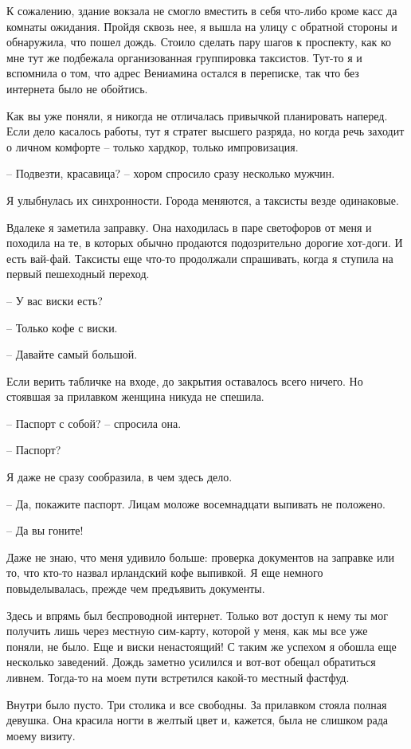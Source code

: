\documentclass[
]{book}
\begin{document}
К сожалению, здание вокзала не смогло вместить в себя что-либо кроме касс да комнаты ожидания. Пройдя сквозь нее, я вышла на улицу с обратной стороны и обнаружила, что пошел дождь. Стоило сделать пару шагов к проспекту, как ко мне тут же подбежала организованная группировка таксистов. Тут-то я и вспомнила о том, что адрес Вениамина остался в переписке, так что без интернета было не обойтись.

Как вы уже поняли, я никогда не отличалась привычкой планировать наперед. Если дело касалось работы, тут я стратег высшего разряда, но когда речь заходит о личном комфорте -- только хардкор, только импровизация.

-- Подвезти, красавица? -- хором спросило сразу несколько мужчин.

Я улыбнулась их синхронности. Города меняются, а таксисты везде одинаковые.

Вдалеке я заметила заправку. Она находилась в паре светофоров от меня и походила на те, в которых обычно продаются подозрительно дорогие хот-доги. И есть вай-фай. Таксисты еще что-то продолжали спрашивать, когда я ступила на первый пешеходный переход.

-- У вас виски есть?

-- Только кофе с виски.

-- Давайте самый большой.

Если верить табличке на входе, до закрытия оставалось всего ничего. Но стоявшая за прилавком женщина никуда не спешила.

-- Паспорт с собой? -- спросила она.

-- Паспорт?

Я даже не сразу сообразила, в чем здесь дело.

-- Да, покажите паспорт. Лицам моложе восемнадцати выпивать не положено.

-- Да вы гоните!

Даже не знаю, что меня удивило больше: проверка документов на заправке или то, что кто-то назвал ирландский кофе выпивкой. Я еще немного повыделывалась, прежде чем предъявить документы.

Здесь и впрямь был беспроводной интернет. Только вот доступ к нему ты мог получить лишь через местную сим-карту, которой у меня, как мы все уже поняли, не было. Еще и виски ненастоящий! С таким же успехом я обошла еще несколько заведений. Дождь заметно усилился и вот-вот обещал обратиться ливнем. Тогда-то на моем пути встретился какой-то местный фастфуд.

Внутри было пусто. Три столика и все свободны. За прилавком стояла полная девушка. Она красила ногти в желтый цвет и, кажется, была не слишком рада моему визиту.
\end{document}

